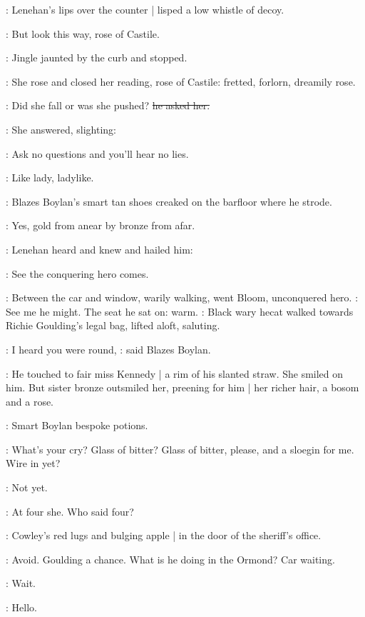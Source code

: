 
:
Lenehan's lips over the counter |
lisped a low whistle of decoy.

\lenehan:
But look this way,
rose of Castile.

:
Jingle jaunted by the curb
and stopped.

:
She rose and closed her reading,
rose of Castile:
fretted,
forlorn,
dreamily rose.

\lenehan:
Did she fall or was she pushed?
\sout{he asked her.}

:
She answered,
slighting:

\MissK:
Ask no questions and you'll hear no lies.

:
Like lady,
ladylike.

:
Blazes Boylan's smart tan shoes creaked on the barfloor
where he strode.

:
Yes,
gold from anear
by bronze from afar.

:
Lenehan heard and knew and hailed him:

\lenehan:
See the conquering hero comes.

:
Between the car and window,
warily walking,
went Bloom,
unconquered hero.
\BloomInt:
See me he might.
The seat he sat on:
warm.
:
Black wary hecat walked towards Richie Goulding's legal bag,
lifted aloft,
saluting.


\boylan:
I heard you were round,
:
said Blazes Boylan.

:
He touched to fair miss Kennedy |
a rim of his slanted straw.
She smiled on him.
But sister bronze outsmiled her,
preening for him |
her richer hair,
a bosom
and a rose.

:
Smart Boylan bespoke potions.

\boylan:
What's your cry?
Glass of bitter?
Glass of bitter,
please,
and a sloegin for me.
Wire in yet?

\MissD:
Not yet.

\BloomInt:
At four she.
Who said four?

:
Cowley's red lugs and bulging apple |
in the door of the sheriff's office.

\BloomInt:
Avoid.
Goulding a chance.
What is he doing in the Ormond?
Car waiting.

\BloomInt:
Wait.

\BloomInt:
Hello.

